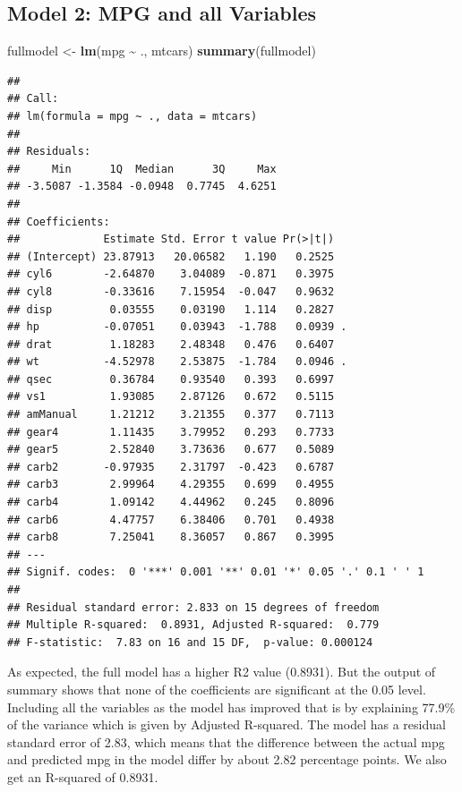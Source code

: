 \documentclass[]{article}
\newenvironment{Shaded}{\begin{snugshade}}{\end{snugshade}}
\newcommand{\KeywordTok}[1]{\textcolor[rgb]{0.13,0.29,0.53}{\textbf{#1}}}
\newcommand{\NormalTok}[1]{#1}
\newcommand{\OperatorTok}[1]{\textcolor[rgb]{0.81,0.36,0.00}{\textbf{#1}}}
\newcommand{\StringTok}[1]{\textcolor[rgb]{0.31,0.60,0.02}{#1}}
\begin{document}
\hypertarget{model-2-mpg-and-all-variables}{%
\subsection{Model 2: MPG and all
Variables}\label{model-2-mpg-and-all-variables}}

\begin{Shaded}
\begin{Highlighting}[]
\NormalTok{fullmodel \textless{}{-}}\StringTok{ }\KeywordTok{lm}\NormalTok{(mpg }\OperatorTok{\textasciitilde{}}\StringTok{ }\NormalTok{., mtcars)}
\KeywordTok{summary}\NormalTok{(fullmodel)}
\end{Highlighting}
\end{Shaded}

\begin{verbatim}
## 
## Call:
## lm(formula = mpg ~ ., data = mtcars)
## 
## Residuals:
##     Min      1Q  Median      3Q     Max 
## -3.5087 -1.3584 -0.0948  0.7745  4.6251 
## 
## Coefficients:
##             Estimate Std. Error t value Pr(>|t|)  
## (Intercept) 23.87913   20.06582   1.190   0.2525  
## cyl6        -2.64870    3.04089  -0.871   0.3975  
## cyl8        -0.33616    7.15954  -0.047   0.9632  
## disp         0.03555    0.03190   1.114   0.2827  
## hp          -0.07051    0.03943  -1.788   0.0939 .
## drat         1.18283    2.48348   0.476   0.6407  
## wt          -4.52978    2.53875  -1.784   0.0946 .
## qsec         0.36784    0.93540   0.393   0.6997  
## vs1          1.93085    2.87126   0.672   0.5115  
## amManual     1.21212    3.21355   0.377   0.7113  
## gear4        1.11435    3.79952   0.293   0.7733  
## gear5        2.52840    3.73636   0.677   0.5089  
## carb2       -0.97935    2.31797  -0.423   0.6787  
## carb3        2.99964    4.29355   0.699   0.4955  
## carb4        1.09142    4.44962   0.245   0.8096  
## carb6        4.47757    6.38406   0.701   0.4938  
## carb8        7.25041    8.36057   0.867   0.3995  
## ---
## Signif. codes:  0 '***' 0.001 '**' 0.01 '*' 0.05 '.' 0.1 ' ' 1
## 
## Residual standard error: 2.833 on 15 degrees of freedom
## Multiple R-squared:  0.8931, Adjusted R-squared:  0.779 
## F-statistic:  7.83 on 16 and 15 DF,  p-value: 0.000124
\end{verbatim}

As expected, the full model has a higher R2 value (0.8931). But the
output of summary shows that none of the coefficients are significant at
the 0.05 level. Including all the variables as the model has improved
that is by explaining 77.9\% of the variance which is given by Adjusted
R-squared. The model has a residual standard error of 2.83, which means
that the difference between the actual mpg and predicted mpg in the
model differ by about 2.82 percentage points. We also get an R-squared
of 0.8931.
\end{document}
